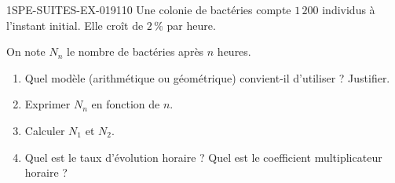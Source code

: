\begin{exercice}{1SPE-SUITES-EX-019}{1}{10}
Une colonie de bactéries compte $1\,200$ individus à l'instant initial.
Elle croît de $2\,\%$ par heure.

On note $N_n$ le nombre de bactéries après $n$ heures.
\begin{enumerate}
  \item Quel modèle (arithmétique ou géométrique) convient-il d'utiliser ? Justifier.
  \item Exprimer $N_n$ en fonction de $n$.
  \item Calculer $N_1$ et $N_2$.
  \item Quel est le taux d'évolution horaire ? Quel est le coefficient multiplicateur horaire ?
\end{enumerate}
\end{exercice}
